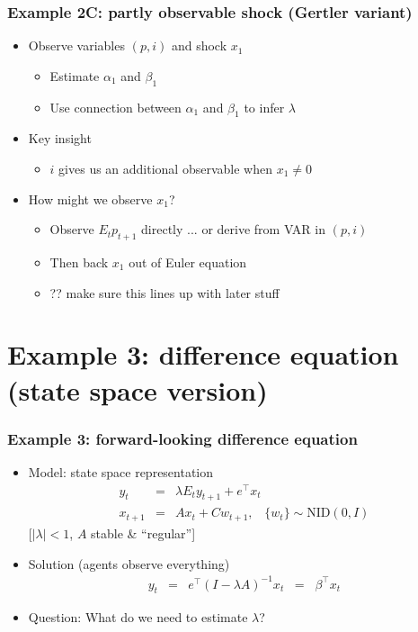 \documentclass{beamer}
\begin{document}
\begin{frame}
\frametitle{Example 2C: partly observable shock (Gertler variant)}
\begin{itemize}  \itemsep=\bigskipamount
\item Observe variables $(p,i)$ and shock $x_1$ \\
\begin{itemize}
\item Estimate $\alpha_{1}$ and $\beta_{1}$
\item Use connection between $\alpha_1$ and $\beta_1$ to infer $\lambda$
\end{itemize}
\item Key insight \\
\begin{itemize}
\item $i$ gives us an additional observable when $x_1 \neq 0$
\end{itemize}
\item How might we observe $x_1$?  \\
\begin{itemize}
\item Observe $E_t p_{t+1}$ directly ... or derive from VAR in $(p,i)$
\item Then back $x_1$ out of Euler equation 
\item ?? make sure this lines up with later stuff 
\end{itemize}
\end{itemize}
\end{frame}

\section{Example 3:  difference equation (state space version)}
\begin{frame}
\frametitle{Example 3: forward-looking difference equation}
\begin{itemize} \itemsep=\bigskipamount
\item Model:  state space representation
\begin{eqnarray*}
    y_t &=& \lambda E_t y_{t+1} + e^\top x_t \phantom{xxxxxx} \\
    x_{t+1} &=& A x_{t} + C w_{t+1},
            \;\;\;\{ w_t \} \sim \mbox{NID}(0,I)
\end{eqnarray*}
[$|\lambda|<1$, $A$ stable \& ``regular'']
\item Solution (agents observe everything)
\begin{eqnarray*}
    y_t &=&  e^\top (I-\lambda A)^{-1} x_t \;\;=\;\; \beta^\top x_t
\end{eqnarray*}
\item Question:  What do we need to estimate $\lambda$?
\end{itemize}
\end{frame}
\end{document}
